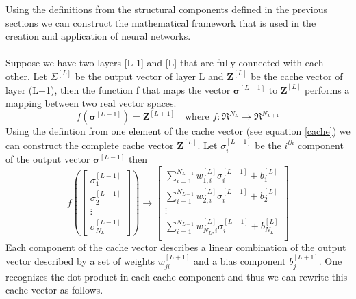 \documentclass[12pt]{article}
\begin{document}
Using the definitions from the structural components defined in the previous sections we can construct the mathematical framework that is used in the creation and application of neural networks.
\\ 
\\
Suppose we have two layers [L-1] and [L] that are fully connected with each other. Let $\Sigma^{[L]}$ be the output vector of layer L and $\textbf{Z}^{[L]}$ be the cache vector of layer (L+1), then the function f that maps the vector $\bm{\sigma}^{[L-1]}$ to $\textbf{Z}^{[L]}$ performs a mapping between two real vector spaces. 	
\begin{equation}
f(\bm{\sigma}^{[L-1]}) = \textbf{Z}^{[L+1]} \quad \text{where } f:\Re^{N_L} \rightarrow \Re^{N_{L+1}}
\end{equation}
Using the defintion from one element of the cache vector (see equation \ref{cache}) we can construct the complete cache vector $\textbf{Z}^{[L]}$. Let $\sigma^{[L-1]}_i$ be the $i^{th}$ component of the output vector $\bm{\sigma}^{[L-1]}$ then
\begin{equation}
f\left(
\begin{bmatrix}
\sigma^{[L-1]}_1 \\
\sigma^{[L-1]}_2 \\
\vdots \\
\sigma^{[L-1]}_{N_L}
\end{bmatrix}
\right)	
\rightarrow
\begin{bmatrix}
\sum_{i=1}^{N_{L-1}}w_{1,i}^{[L]}\sigma_{i}^{[L-1]} + b^{[L]}_1 \\
\sum_{i=1}^{N_{L-1}}w_{2,i}^{[L]}\sigma_{i}^{[L-1]} + b^{[L]}_2 \\
\vdots \\
\sum_{i=1}^{N_{L-1}}w_{N_{L},i}^{[L]}\sigma_{i}^{[L-1]} + b^{[L]}_{N_{L}} \\
\end{bmatrix}
\end{equation}
Each component of the cache vector describes a linear combination of the output vector described by a set of weights $w_{ji}^{[L+1]}$ and a bias component $b_j^{[L+1]}$. One recognizes the dot product in each cache component and thus we can rewrite this cache vector as follows.  
\end{document}
